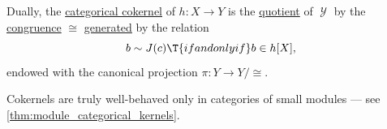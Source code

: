 \begin{proposition}
\begin{thmenum}
     Dually, the \hyperref[def:categorical_kernels/cokernel]{categorical cokernel} of \( h: X \to Y \) is the \hyperref[def:fol_quotient_structure]{quotient} of \( \mscrY \) by the \hyperref[def:fol_congruence]{congruence} \( {\cong} \) \hyperref[def:fol_generated_congruence]{generated} by the relation
    \begin{equation}\label{eq:thm:equational_theory_zero_morphisms/cokernel/relation}
      b \sim J(c) \T{if and only if} b \in h[X],
    \end{equation}
    endowed with the canonical projection \( \pi: Y \to Y / {\cong} \).
  \end{thmenum}
\end{proposition}
\begin{comments}
  \item Cokernels are truly well-behaved only in categories of small modules --- see \cref{thm:module_categorical_kernels}.
\end{comments}
